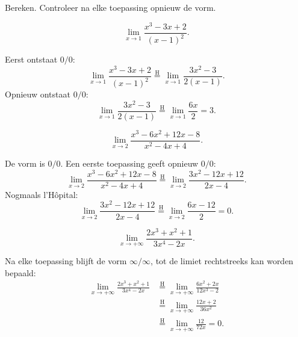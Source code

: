 \documentclass{ximera}
\begin{document}
\begin{oefening}{\oefB\ESS}

Bereken. Controleer na elke toepassing opnieuw de vorm.

\begin{question}
\[\lim_{x\to1}\frac{x^3-3x+2}{(x-1)^2}.\]

\begin{oplossing}
Eerst ontstaat \(0/0\):
\[\lim_{x\to1}\frac{x^3-3x+2}{(x-1)^2}\overset{\mathrm H}{=}\lim_{x\to1}\frac{3x^2-3}{2(x-1)}.\]
Opnieuw ontstaat \(0/0\):
\[\lim_{x\to1}\frac{3x^2-3}{2(x-1)}\overset{\mathrm H}{=}\lim_{x\to1}\frac{6x}{2}=3.\]
\end{oplossing}
\end{question}

\begin{question}
\[\lim_{x\to2}\frac{x^3-6x^2+12x-8}{x^2-4x+4}.\]

\begin{oplossing}
De vorm is \(0/0\). Een eerste toepassing geeft opnieuw \(0/0\):
\[\lim_{x\to2}\frac{x^3-6x^2+12x-8}{x^2-4x+4}\overset{\mathrm H}{=}\lim_{x\to2}\frac{3x^2-12x+12}{2x-4}.\]
Nogmaals l'Hôpital:
\[\lim_{x\to2}\frac{3x^2-12x+12}{2x-4}\overset{\mathrm H}{=}\lim_{x\to2}\frac{6x-12}{2}=0.\]
\end{oplossing}
\end{question}

\begin{question}
\[\lim_{x\to+\infty}\frac{2x^3+x^2+1}{3x^4-2x}.\]

\begin{oplossing}
Na elke toepassing blijft de vorm \(\infty/\infty\), tot de limiet
rechtstreeks kan worden bepaald:
\[
\begin{aligned}
\lim_{x\to+\infty}\frac{2x^3+x^2+1}{3x^4-2x}
&\overset{\mathrm H}{=}\lim_{x\to+\infty}\frac{6x^2+2x}{12x^3-2}\\
&\overset{\mathrm H}{=}\lim_{x\to+\infty}\frac{12x+2}{36x^2}\\
&\overset{\mathrm H}{=}\lim_{x\to+\infty}\frac{12}{72x}=0.
\end{aligned}
\]
\end{oplossing}
\end{question}
\end{oefening}

\end{document}
